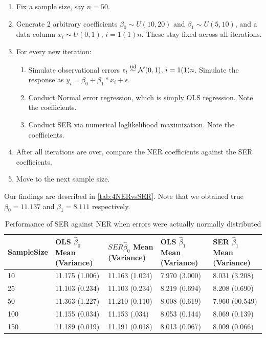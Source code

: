 \begin{enumerate}
	\item Fix a sample size, say $n=50$.
	\item Generate 2 arbitrary coefficients $\beta_0 \sim U(10,20)$ and $\beta_1 \sim U(5,10)$, and a data column $x_i \sim U(0,1), \, i=1(1)n$. These stay fixed across all iterations.
	\item For every new iteration:
	\begin{enumerate}
		\item Simulate observational errors $\epsilon_i \overset{\text{iid}}{\sim} \mathcal{N}(0,1), \, i=1(1)n$. Simulate the response as $y_i=\beta_0 + \beta_1*x_i + \epsilon$.
		\item Conduct Normal error regression, which is simply OLS regression. Note the coefficients.
		\item Conduct SER via numerical loglikelihood maximization. Note the coefficients.
	\end{enumerate}
	\item After all iterations are over, compare the NER coefficients against the SER coefficients.
	\item Move to the next sample size.
\end{enumerate}

Our findings are described in \autoref{tab:4NERvsSER}. Note that we obtained true $\beta_0 = 11.137$ and $\beta_1 = 8.111$ respectively.

\begin{table}[h!]
	\centering
	\begin{tabularx}{\linewidth}{X|X|X|X|X}
		Sample\newline Size  &  OLS $\hat\beta_0$ \newline Mean (Variance)  &  $SER \hat\beta_0$ \newline Mean (Variance)  &  OLS $\hat\beta_1$\newline Mean (Variance) &  SER $\hat\beta_1$\newline Mean (Variance)\\
		\hline
		10  & 11.175 (1.006) & 11.163 (1.024) & 7.970 (3.000) & 8.031 (3.208) \\
		25  & 11.103 (0.234) & 11.103 (0.234) & 8.219 (0.694) & 8.208 (0.690) \\
		50  & 11.363 (1.227) & 11.210 (0.110) & 8.008 (0.619) & 7.960 (00.549) \\
		100  & 11.155 (0.034) & 11.153 (.034) & 8.053 (0.144) & 8.069 (0.139) \\
		150  & 11.189 (0.019) & 11.191 (0.018) & 8.013 (0.067) & 8.009 (0.066) \\
		\hline
	\end{tabularx}
	\caption{Performance of SER against NER when errors were actually normally distributed}
	\label{tab:4NERvsSER}
\end{table}

